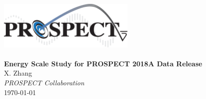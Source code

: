 \begin{titlepage}

\begin{center}

\includegraphics[width=0.50\textwidth]{figures/PROSPECT_logo}\\[1cm]    

\HRule \\[0.4cm]
{\huge \bfseries Energy Scale Study for PROSPECT 2018A Data Release}
\HRule \\[1.5cm]


{\Large X. Zhang}\\
\emph{\Large PROSPECT Collaboration}\\


\vfill
{\large \today}

\end{center}

\end{titlepage}
\newpage

